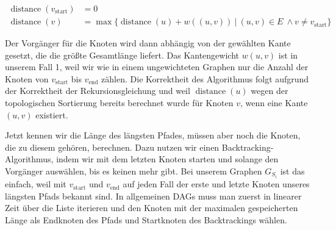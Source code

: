 \begin{equation}
\begin{split}
	\operatorname{distance}(v_{\mathrm{start}}) & = 0 \\
	\operatorname{distance}(v)       & = \max\{\operatorname{distance}(u) + w((u,v))\:|\:(u,v) \in E\ \wedge v \neq v_{\mathrm{start}}\} 
\end{split}
\end{equation} 

Der Vorgänger für die Knoten wird dann abhängig von der gewählten Kante gesetzt, die die größte Gesamtlänge liefert. Das Kantengewicht $w(u,v)$ ist in unserem Fall 1, weil wir wie in einem ungewichteten Graphen nur die Anzahl der Knoten von $v_{\mathrm{start}}$ bis $v_{\mathrm{end}}$ zählen. Die Korrektheit des Algorithmus folgt aufgrund der Korrektheit der Rekursionsgleichung und weil $\operatorname{distance}(u)$ wegen der topologischen Sortierung bereits berechnet wurde für Knoten $v$, wenn eine Kante $(u,v)$ existiert.

Jetzt kennen wir die Länge des längsten Pfades, müssen aber noch die Knoten, die zu diesem gehören, berechnen. Dazu nutzen wir einen Backtracking-Algorithmus, indem wir mit dem letzten Knoten starten und solange den Vorgänger auswählen, bis es keinen mehr gibt. Bei unserem Graphen $G_{S_i}$ ist das einfach, weil mit $v_{\mathrm{start}}$ und $v_{\mathrm{end}}$ auf jeden Fall der erste und letzte Knoten unseres längsten Pfads bekannt sind. In allgemeinen DAGs muss man zuerst in linearer Zeit über die Liste iterieren und den Knoten mit der maximalen gespeicherten Länge als Endknoten des Pfads und Startknoten des Backtrackings wählen.

